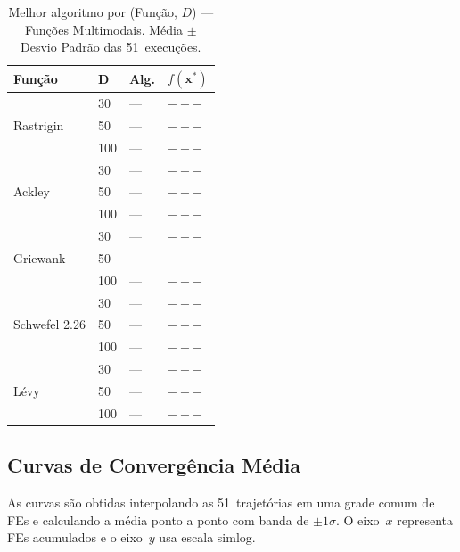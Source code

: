 \documentclass[runningheads]{llncs}
\begin{document}
\begin{table}[H]
\caption{Melhor algoritmo por (Função, $D$) — Funções Multimodais.
Média $\pm$ Desvio Padrão das 51~execuções.}
\label{tab:multimodais}
\centering
\scriptsize
\begin{tabular}{llll}
\toprule
\textbf{Função} & \textbf{D} & \textbf{Alg.} & $f(\mathbf{x}^*)$ \\
\midrule
\multirow{3}{*}{Rastrigin}
  & 30  & --- & $\mathbf{---}$ \\
  & 50  & --- & $\mathbf{---}$ \\
  & 100 & --- & $\mathbf{---}$ \\
\midrule
\multirow{3}{*}{Ackley}
  & 30  & --- & $\mathbf{---}$ \\
  & 50  & --- & $\mathbf{---}$ \\
  & 100 & --- & $\mathbf{---}$ \\
\midrule
\multirow{3}{*}{Griewank}
  & 30  & --- & $\mathbf{---}$ \\
  & 50  & --- & $\mathbf{---}$ \\
  & 100 & --- & $\mathbf{---}$ \\
\midrule
\multirow{3}{*}{Schwefel 2.26}
  & 30  & --- & $\mathbf{---}$ \\
  & 50  & --- & $\mathbf{---}$ \\
  & 100 & --- & $\mathbf{---}$ \\
\midrule
\multirow{3}{*}{Lévy}
  & 30  & --- & $\mathbf{---}$ \\
  & 50  & --- & $\mathbf{---}$ \\
  & 100 & --- & $\mathbf{---}$ \\
\bottomrule
\end{tabular}
\end{table}

\subsection{Curvas de Converg\^{e}ncia M\'{e}dia}

As curvas são obtidas interpolando as 51~trajetórias em uma grade
comum de FEs e calculando a média ponto a ponto com banda de $\pm1\sigma$.
O eixo~$x$ representa FEs acumulados e o eixo~$y$ usa escala simlog.

\end{document}
